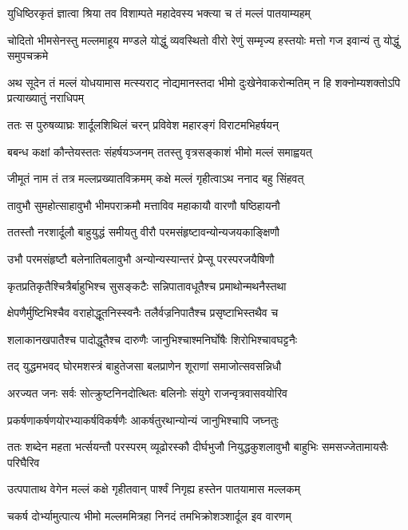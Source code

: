 \twolineshloka
{युधिष्ठिरकृतं ज्ञात्वा श्रिया तव विशाम्पते}
{महादेवस्य भक्त्या च तं मल्लं पातयाम्यहम्}



\threelineshloka
{चोदितो भीमसेनस्तु मल्लमाहूय मण्डले}
{योद्धुं व्यवस्थितो वीरो रेणुं सम्मृज्य हस्तयोः}
{मत्तो गज इवान्यं तु योद्धुं समुपचक्रमे}


\onelineshloka
{अथ सूदेन तं मल्लं योधयामास मत्स्यराट्}
\twolineshloka
{नोद्यमानस्तदा भीमो दुःखेनेवाकरोन्मतिम्}
{न हि शक्नोम्यशक्तोऽपि प्रत्याख्यातुं नराधिपम्}


\twolineshloka
{ततः स पुरुषव्याघ्रः शार्दूलशिथिलं चरन्}
{प्रविवेश महारङ्गं विराटमभिहर्षयन्}


\twolineshloka
{बबन्ध कक्षां कौन्तेयस्ततः संहर्षयञ्जनम्}
{ततस्तु वृत्रसङ्काशं भीमो मल्लं समाह्वयत्}


\twolineshloka
{जीमूतं नाम तं तत्र मल्लप्रख्यातविक्रमम्}
{कक्षे मल्लं गृहीत्वाऽथ ननाद बहु सिंहवत्}


\twolineshloka
{तावुभौ सुमहोत्साहावुभौ भीमपराक्रमौ}
{मत्ताविव महाकायौ वारणौ षष्ठिहायनौ}


\twolineshloka
{ततस्तौ नरशार्दूलौ बाहुयुद्धं समीयतु}
{वीरौ परमसंहृष्टावन्योन्यजयकाङ्क्षिणौ}


\twolineshloka
{उभौ परमसंहृष्टौ बलेनातिबलावुभौ}
{अन्योन्यस्यान्तरं प्रेप्सू परस्परजयैषिणौ}


\twolineshloka
{कृतप्रतिकृतैश्चित्रैर्बाहुभिश्च सुसङ्कटैः}
{सन्निपातावधूतैश्च प्रमाथोन्मथनैस्तथा}


\twolineshloka
{क्षेपणैर्मुष्टिभिश्चैव वराहोद्धूतनिस्स्वनैः}
{तलैर्वज्रनिपातैश्च प्रसृष्टाभिस्तथैव च}


\twolineshloka
{शलाकानखपातैश्च पादोद्धूतैश्च दारुणैः}
{जानुभिश्चाश्मनिर्घोषैः शिरोभिश्चावघट्टनैः}


\twolineshloka
{तद् युद्धमभवद् घोरमशस्त्रं बाहुतेजसा}
{बलप्राणेन शूराणां समाजोत्सवसन्निधौ}


\twolineshloka
{अरज्यत जनः सर्वः सोत्क्रुष्टनिनदोत्थितः}
{बलिनोः संयुगे राजन्वृत्रवासवयोरिव}


\twolineshloka
{प्रकर्षणाकर्षणयोरभ्याकर्षविकर्षणैः}
{आकर्षतुरथान्योन्यं जानुभिश्चापि जघ्नतुः}


\threelineshloka
{ततः शब्देन महता भर्त्सयन्तौ परस्परम्}
{व्यूढोरस्कौ दीर्घभुजौ नियुद्धकुशलावुभौ}
{बाहुभिः समसज्जेतामायसैः परिघैरिव}


\twolineshloka
{उत्पपाताथ वेगेन मल्लं कक्षे गृहीतवान्}
{पार्श्वं निगृह्य हस्तेन पातयामास मल्लकम्}


\twolineshloka
{चकर्ष दोर्भ्यामुत्पात्य भीमो मल्लममित्रहा}
{निनदं तमभिक्रोशञ्शार्दूल इव वारणम्}


